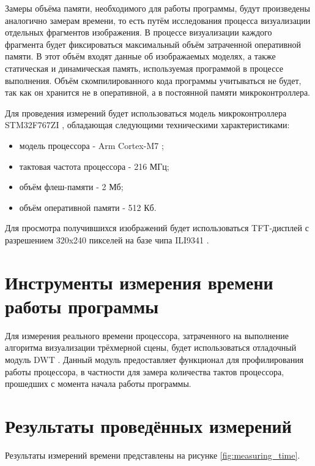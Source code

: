 Замеры объёма памяти, необходимого для работы программы, будут произведены аналогично замерам времени, то есть путём исследования 
процесса визуализации отдельных фрагментов изображения. В процессе визуализации каждого фрагмента будет фиксироваться максимальный 
объём затраченной оперативной памяти. В этот объём входят данные об изображаемых моделях, а также статическая и динамическая память, 
используемая программой в процессе выполнения. Объём скомпилированного кода программы учитываться не будет, так как он хранится 
не в оперативной, а в постоянной памяти микроконтроллера.

Для проведения измерений будет использоваться модель микроконтроллера STM32F767ZI \cite{STM32F767ZI}, обладающая следующими 
техническими характеристиками:
\begin{itemize}
	\item модель процессора - Arm Cortex-M7 \cite{cortex_m7};
	\item тактовая частота процессора - 216 МГц;
	\item объём флеш-памяти - 2 Мб;
    \item объём оперативной памяти - 512 Кб.
\end{itemize}

Для просмотра получившихся изображений будет использоваться TFT-дисплей с разрешением 320x240 пикселей на базе чипа ILI9341 \cite{ili9341}.



\section{Инструменты измерения времени работы программы}
Для измерения реального времени процессора, затраченного на выполнение алгоритма визуализации трёхмерной сцены, будет использоваться 
отладочный модуль DWT \cite{dwt}. Данный модуль предоставляет функционал для профилирования работы процессора, в частности для замера 
количества тактов процессора, прошедших с момента начала работы программы.



\section{Результаты проведённых измерений}
Результаты измерений времени представлены на рисунке \ref{fig:measuring_time}.

        
